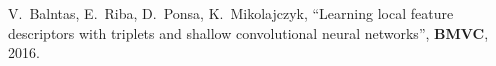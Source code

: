 V.~Balntas, E.~Riba, D.~Ponsa, K.~Mikolajczyk, ``Learning local feature descriptors with triplets and shallow convolutional neural networks'', \textbf{BMVC}, 2016.